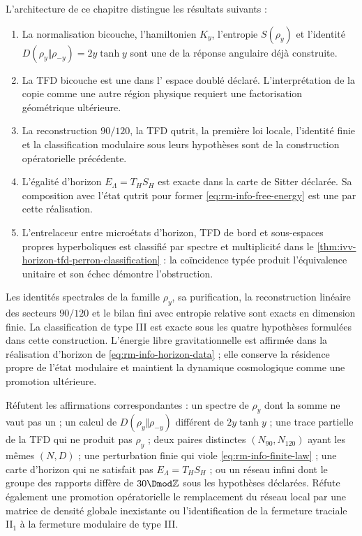L'architecture de ce chapitre distingue les résultats suivants :
\begin{enumerate}[label=\textup{(\roman*)}]
 \item La normalisation bicouche, l'hamiltonien
 \(K_y\), l'entropie
 \(S(\rho_y)\) et l'identité
 \(D(\rho_y\Vert\rho_{-y})=2y\tanh y\) sont une
  de la réponse angulaire déjà
 construite.
 \item La TFD bicouche est une  dans l'
 espace doublé déclaré. L'interprétation de la copie comme une autre
 région physique requiert une factorisation géométrique ultérieure.
 \item La reconstruction \(90/120\), la TFD qutrit, la première loi locale,
 l'identité finie et la classification modulaire sous leurs hypothèses sont
  de la construction opératorielle précédente.
 \item L'égalité d'horizon
 \(E_\Lambda=T_HS_H\) est exacte dans la carte de Sitter déclarée. Sa
 composition avec l'état qutrit pour former
 \cref{eq:rm-info-free-energy} est une
  par cette réalisation.
 \item L'entrelaceur entre microétats d'horizon, TFD de bord et
 sous-espaces propres hyperboliques est classifié par spectre et multiplicité
 dans le \cref{thm:ivv-horizon-tfd-perron-classification} : la coïncidence
 typée produit l'équivalence unitaire et son échec démontre l'obstruction.
\end{enumerate}

\begin{proofstatusbox}
Les identités spectrales de la famille \(\rho_y\), sa purification,
la reconstruction linéaire des secteurs \(90/120\) et le bilan fini
avec entropie relative sont exacts en dimension finie. La classification de
type III est exacte sous les quatre hypothèses formulées dans cette construction.
L'énergie libre gravitationnelle est affirmée dans la réalisation d'horizon de
\cref{eq:rm-info-horizon-data} ; elle conserve la résidence propre de l'état
modulaire et maintient la dynamique cosmologique comme une promotion ultérieure.
\end{proofstatusbox}

\begin{falsifierbox}
Réfutent les affirmations correspondantes : un spectre de \(\rho_y\) dont la somme ne
vaut pas un ; un calcul de
\(D(\rho_y\Vert\rho_{-y})\) différent de \(2y\tanh y\) ; une trace partielle de
la TFD qui ne produit pas \(\rho_y\) ; deux paires distinctes
\((N_{90},N_{120})\) ayant les mêmes \((N,D)\) ; une perturbation finie
qui viole \cref{eq:rm-info-finite-law} ; une carte d'horizon qui ne satisfait pas
\(E_\Lambda=T_HS_H\) ; ou un réseau infini dont le groupe des rapports diffère de
\(30\Dmod\mathbb Z\) sous les hypothèses déclarées. Réfute également une
promotion opératorielle le remplacement du réseau local par une matrice de densité
globale inexistante ou l'identification de la fermeture traciale II\(_1\) à la
fermeture modulaire de type III.
\end{falsifierbox}
